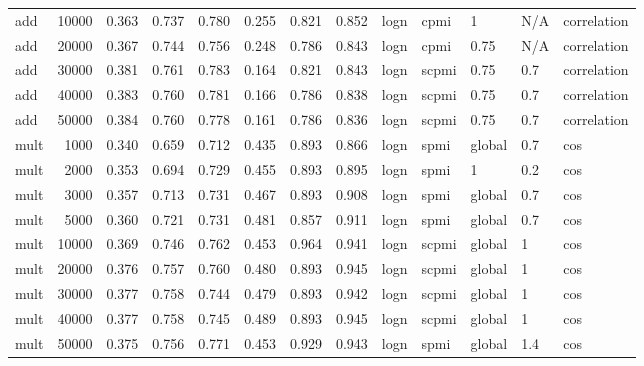 \begin{tabular}{lrrrrrrrlllll}
     add &           10000 &      0.363 &  0.737 &  0.780 &  0.255 &      0.821 &      0.852 &  logn &   cpmi &       1 &  N/A &    correlation \\
     add &           20000 &      0.367 &  0.744 &  0.756 &  0.248 &      0.786 &      0.843 &  logn &   cpmi &    0.75 &  N/A &    correlation \\
     add &           30000 &      0.381 &  0.761 &  0.783 &  0.164 &      0.821 &      0.843 &  logn &  scpmi &    0.75 &  0.7 &    correlation \\
     add &           40000 &      0.383 &  0.760 &  0.781 &  0.166 &      0.786 &      0.838 &  logn &  scpmi &    0.75 &  0.7 &    correlation \\
     add &           50000 &      0.384 &  0.760 &  0.778 &  0.161 &      0.786 &      0.836 &  logn &  scpmi &    0.75 &  0.7 &    correlation \\
    mult &            1000 &      0.340 &  0.659 &  0.712 &  0.435 &      0.893 &      0.866 &  logn &   spmi &  global &  0.7 &            cos \\
    mult &            2000 &      0.353 &  0.694 &  0.729 &  0.455 &      0.893 &      0.895 &  logn &   spmi &       1 &  0.2 &            cos \\
    mult &            3000 &      0.357 &  0.713 &  0.731 &  0.467 &      0.893 &      0.908 &  logn &   spmi &  global &  0.7 &            cos \\
    mult &            5000 &      0.360 &  0.721 &  0.731 &  0.481 &      0.857 &      0.911 &  logn &   spmi &  global &  0.7 &            cos \\
    mult &           10000 &      0.369 &  0.746 &  0.762 &  0.453 &      0.964 &      0.941 &  logn &  scpmi &  global &    1 &            cos \\
    mult &           20000 &      0.376 &  0.757 &  0.760 &  0.480 &      0.893 &      0.945 &  logn &  scpmi &  global &    1 &            cos \\
    mult &           30000 &      0.377 &  0.758 &  0.744 &  0.479 &      0.893 &      0.942 &  logn &  scpmi &  global &    1 &            cos \\
    mult &           40000 &      0.377 &  0.758 &  0.745 &  0.489 &      0.893 &      0.945 &  logn &  scpmi &  global &    1 &            cos \\
    mult &           50000 &      0.375 &  0.756 &  0.771 &  0.453 &      0.929 &      0.943 &  logn &   spmi &  global &  1.4 &            cos \\

\end{tabular}
